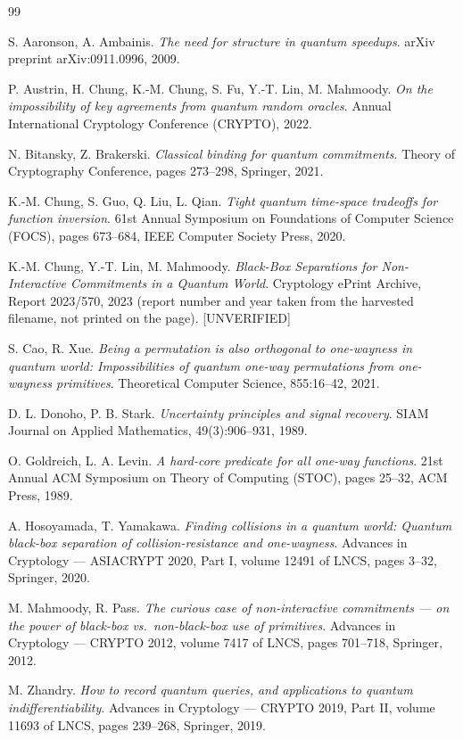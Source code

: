 \documentclass{conjura-conjecture}
\begin{document}
\begin{conjurabibliography}{99}

S. Aaronson, A. Ambainis.
\emph{The need for structure in quantum speedups}.
arXiv preprint arXiv:0911.0996, 2009.

P. Austrin, H. Chung, K.-M. Chung, S. Fu, Y.-T. Lin, M. Mahmoody.
\emph{On the impossibility of key agreements from quantum random
oracles}.
Annual International Cryptology Conference (CRYPTO), 2022.

N. Bitansky, Z. Brakerski.
\emph{Classical binding for quantum commitments}.
Theory of Cryptography Conference, pages 273--298, Springer, 2021.

K.-M. Chung, S. Guo, Q. Liu, L. Qian.
\emph{Tight quantum time-space tradeoffs for function inversion}.
61st Annual Symposium on Foundations of Computer Science (FOCS), pages
673--684, IEEE Computer Society Press, 2020.

K.-M. Chung, Y.-T. Lin, M. Mahmoody.
\emph{Black-Box Separations for Non-Interactive Commitments in a Quantum
World}.
Cryptology ePrint Archive, Report 2023/570, 2023 (report number and year
taken from the harvested filename, not printed on the page). [UNVERIFIED]

S. Cao, R. Xue.
\emph{Being a permutation is also orthogonal to one-wayness in quantum
world: Impossibilities of quantum one-way permutations from one-wayness
primitives}.
Theoretical Computer Science, 855:16--42, 2021.

D. L. Donoho, P. B. Stark.
\emph{Uncertainty principles and signal recovery}.
SIAM Journal on Applied Mathematics, 49(3):906--931, 1989.

O. Goldreich, L. A. Levin.
\emph{A hard-core predicate for all one-way functions}.
21st Annual ACM Symposium on Theory of Computing (STOC), pages 25--32,
ACM Press, 1989.

A. Hosoyamada, T. Yamakawa.
\emph{Finding collisions in a quantum world: Quantum black-box
separation of collision-resistance and one-wayness}.
Advances in Cryptology --- ASIACRYPT 2020, Part I, volume 12491 of LNCS,
pages 3--32, Springer, 2020.

M. Mahmoody, R. Pass.
\emph{The curious case of non-interactive commitments --- on the power of
black-box vs.\ non-black-box use of primitives}.
Advances in Cryptology --- CRYPTO 2012, volume 7417 of LNCS, pages
701--718, Springer, 2012.

M. Zhandry.
\emph{How to record quantum queries, and applications to quantum
indifferentiability}.
Advances in Cryptology --- CRYPTO 2019, Part II, volume 11693 of LNCS,
pages 239--268, Springer, 2019.

\end{conjurabibliography}
\end{document}
